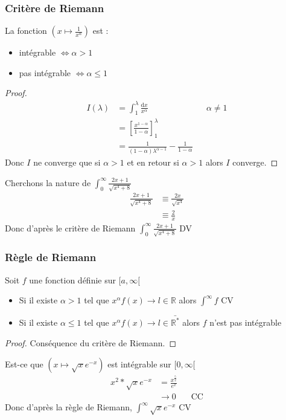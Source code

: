 \documentclass[11pt,colorlinks]{book}
\theoremstyle{mytheoremstyle}
\theoremstyle{mytheoremstyle}
\theoremstyle{mytheoremstyle}
\theoremstyle{mytheoremstyle}
\theoremstyle{mytheoremstyle}
\theoremstyle{mytheoremstyle}
\theoremstyle{mytheoremstyle}
\theoremstyle{mytheoremstyle}
\theoremstyle{myproblemstyle}
\def\mbb#1{\mathbb{#1}}
\def\bR{\mbb{R}}
\begin{document}
  \subsubsection{Critère de Riemann}
  \begin{theorem}
    La fonction $(x \mapsto \frac{1}{x^{\alpha}})$ est : 
    \begin{itemize}
      \item intégrable $\Leftrightarrow \alpha > 1$
      \item pas intégrable $\Leftrightarrow \alpha \leq 1$ 
    \end{itemize}
    \begin{proof}
      \begin{align*}
        I(\lambda) &= \int_1^{\lambda} \frac{\text{d}x}{x^{\alpha}} && \alpha \not= 1 \\
                  &= \left[\frac{x^{1 - \alpha}}{1 - \alpha}\right]_1^{\lambda} \\ 
                  &= \frac{1}{(1-\alpha)\lambda^{\alpha-1}} - \frac{1}{1-\alpha}
      \end{align*}
      Donc $I$ ne converge que si $\alpha > 1$ et en retour si $\alpha > 1$ alors $I$ converge.
    \end{proof}
  \end{theorem}
  \begin{ex}
    Cherchons la nature de $\int_0^{\infty} \frac{2x+1}{\sqrt{x^4+8}}$ 
    \begin{align*}
      \frac{2x+1}{\sqrt{x^4+8}} &\equiv \frac{2x}{\sqrt{x^4}} \\ 
                                &\equiv \frac{2}{x}
    \end{align*}
    Donc d'après le critère de Riemann $\int_0^{\infty} \frac{2x+1}{\sqrt{x^4+8}}$ DV
  \end{ex}
  \subsubsection{Règle de Riemann}
  \begin{prop}
    Soit $f$ une fonction définie sur $[a,\infty[$
    \begin{itemize}
      \item Si il existe $\alpha > 1$ tel que $x^{\alpha}f(x) \to l \in \bR$ alors $\int^{\infty} f$ CV
      \item Si il existe $\alpha \leq 1$ tel que $x^{\alpha}f(x) \to l \in \bar{\bR^{*}}$ alors $f$ n'est pas intégrable     
    \end{itemize}
    \begin{proof}
      Conséquence du critère de Riemann.
    \end{proof}
  \end{prop}
  \begin{ex}
    Est-ce que $(x \mapsto \sqrt{x}e^{-x})$ est intégrable sur $[0,\infty[$
    \begin{align*}
      x^2*\sqrt{x}e^{-x} &= \frac{x^{\frac{5}{2}}}{e^x} \\ 
                        &\to 0 && \text{CC} 
    \end{align*}
    Donc d'après la règle de Riemann, $\int^{\infty} \sqrt{x}e^{-x}$ CV
  \end{ex}
\end{document}
